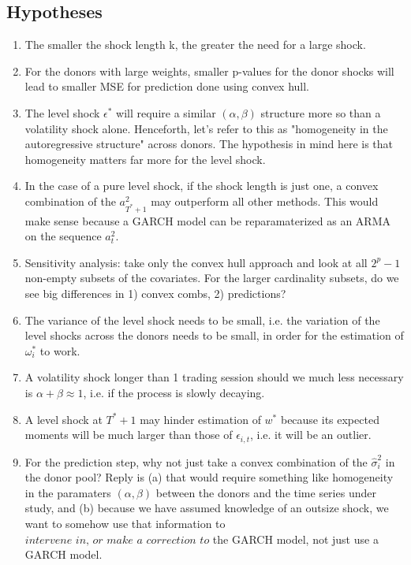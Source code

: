 \documentclass[11pt]{article}
\theoremstyle{definition}
\begin{document}
\subsection{Hypotheses}
\begin{enumerate}
\item The smaller the shock length k, the greater the need for a large shock.  
\item For the donors with large weights, smaller p-values for the donor shocks will lead to smaller MSE for prediction done using convex hull.
\item The level shock $\epsilon^{*}$ will require a similar $(\alpha, \beta)$ structure more so than a volatility shock alone.  Henceforth, let's refer to this as "homogeneity in the autoregressive structure" across donors.  The hypothesis in mind here is that homogeneity matters far more for the level shock.
\item In the case of a pure level shock, if the shock length is just one, a convex combination of the $a^{2}_{T^{*}+1}$ may outperform all other methods.  This would make sense because a GARCH model can be reparamaterized as an ARMA on the sequence $a^{2}_{t}$.
\item Sensitivity analysis: take only the convex hull approach and look at all $2^{p }- 1$ non-empty subsets of the covariates. For the larger cardinality subsets, do we see big differences in 1) convex combs, 2) predictions?
\item The variance of the level shock needs to be small, i.e. the variation of the level shocks across the donors needs to be small, in order for the estimation of $\omega^{*}_i$ to work.
\item A volatility shock longer than 1 trading session should we much less necessary is $\alpha + \beta \approx 1$, i.e. if the process is slowly decaying.
\item A level shock at $T^{*}+1$ may hinder estimation of $w^{*}$ because its expected moments will be much larger than those of $\epsilon_{i,t}$, i.e. it will be an outlier.
\item For the prediction step, why not just take a convex combination of the $\hat\sigma^{2}_{i}$ in the donor pool?  Reply is (a) that would require something like homogeneity in the paramaters $(\alpha, \beta)$ between the donors and the time series under study, and (b) because we have assumed knowledge of an outsize shock, we want to somehow use that information to $\textit{intervene in, or make a correction to}$ the GARCH model, not just use a GARCH model.

\end{enumerate}
\end{document}
